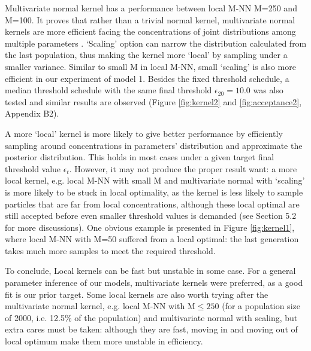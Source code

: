 Multivariate normal kernel has a performance between local M-NN M=250 and M=100. It proves that rather than a trivial normal kernel, multivariate normal kernels are more efficient facing the concentrations of joint distributions among multiple parameters \cite{ref:kernel}. `Scaling' option can narrow the distribution calculated from the last population, thus making the kernel more `local' by sampling under a smaller variance. Similar to small M in local M-NN, small `scaling' is also more efficient in our experiment of model 1. Besides the fixed threshold schedule, a median threshold schedule with the same final threshold $\epsilon_{20}=10.0$ was also tested and similar results are observed (Figure \ref{fig:kernel2} and \ref{fig:acceptance2}, Appendix B2).

A more `local' kernel is more likely to give better performance by efficiently sampling around concentrations in parameters' distribution and approximate the posterior distribution. This holds in most cases under a given target final threshold value $\epsilon_t$. However, it may not produce the proper result want: a more local kernel, e.g. local M-NN with small M and multivariate normal with `scaling' is more likely to be stuck in local optimality, as the kernel is less likely to sample particles that are far from local concentrations, although these local optimal are still accepted before even smaller threshold values is demanded (see Section 5.2 for more discussions). One obvious example is presented in Figure \ref{fig:kernel1}, where local M-NN with M=50 suffered from a local optimal: the last generation takes much more samples to meet the required threshold.



To conclude, Local kernels can be fast but unstable in some case. For a general parameter inference of our models, multivariate kernels were preferred, as a good fit is our prior target. Some local kernels are also worth trying after the multivariate normal kernel, e.g. local M-NN with M$\leq 250$ (for a population size of 2000, i.e. 12.5\% of the population) and multivariate normal with scaling, but extra cares must be taken: although they are fast, moving in and moving out of local optimum make them more unstable in efficiency.

